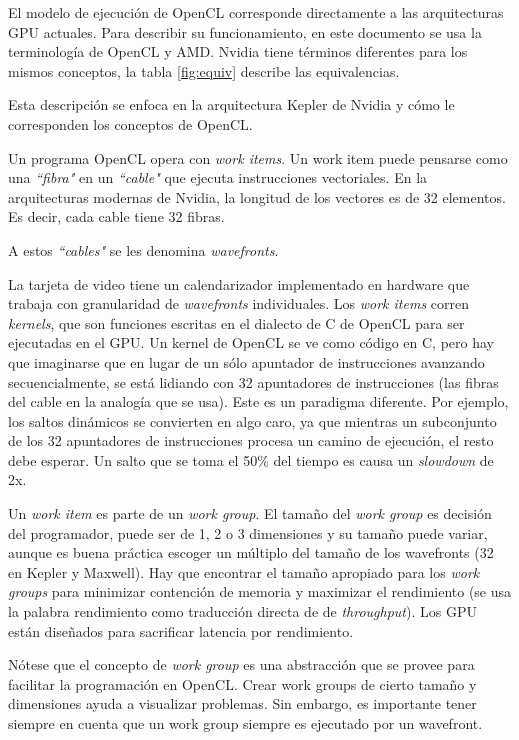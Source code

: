 El modelo de ejecución de OpenCL corresponde directamente a las arquitecturas
GPU actuales. Para describir su funcionamiento, en este documento se usa la
terminología de OpenCL y AMD. Nvidia tiene términos diferentes para los mismos
conceptos, la tabla \ref{fig:equiv} describe las equivalencias.

Esta descripción se enfoca en la arquitectura Kepler de Nvidia y cómo le
corresponden los conceptos de OpenCL.

Un programa OpenCL opera con \emph{work items}. Un work item puede pensarse
como una \emph{``fibra"} en un \emph{``cable"} que ejecuta instrucciones
vectoriales. En la arquitecturas modernas de Nvidia, la longitud de los
vectores es de 32 elementos. Es decir, cada cable tiene 32 fibras.

A estos \emph{``cables"} se les denomina \emph{wavefronts}.

La tarjeta de video tiene un calendarizador implementado en hardware que
trabaja con granularidad de \emph{wavefronts} individuales. Los \emph{work
items} corren \emph{kernels}, que son funciones escritas en el
dialecto de C de OpenCL para ser ejecutadas en el GPU. Un kernel de OpenCL se
ve como código en C, pero hay que imaginarse que en lugar de un sólo apuntador
de instrucciones avanzando secuencialmente, se está lidiando con 32 apuntadores
de instrucciones (las fibras del cable en la analogía que se usa). Este es un
paradigma diferente. Por ejemplo, los saltos dinámicos se convierten en algo
caro, ya que mientras un subconjunto de los 32 apuntadores de instrucciones
procesa un camino de ejecución, el resto debe esperar. Un salto que se toma el
50\% del tiempo es causa un \emph{slowdown} de 2x.

Un \emph{work item} es parte de un \emph{work group}. El tamaño del \emph{work
group} es decisión del programador, puede ser de 1, 2 o 3 dimensiones y su
tamaño puede variar, aunque es buena práctica escoger un múltiplo del tamaño de
los wavefronts (32 en Kepler y Maxwell). Hay que encontrar el tamaño apropiado
para los \emph{work groups} para minimizar contención de memoria y maximizar el
rendimiento (se usa la palabra rendimiento como traducción directa de de
\emph{throughput}). Los GPU están diseñados para sacrificar latencia por
rendimiento.

Nótese que el concepto de \emph{work group} es una abstracción que se provee
para facilitar la programación en OpenCL. Crear work groups de cierto tamaño y
dimensiones ayuda a visualizar problemas. Sin embargo, es importante tener
siempre en cuenta que un work group siempre es ejecutado por un wavefront.

